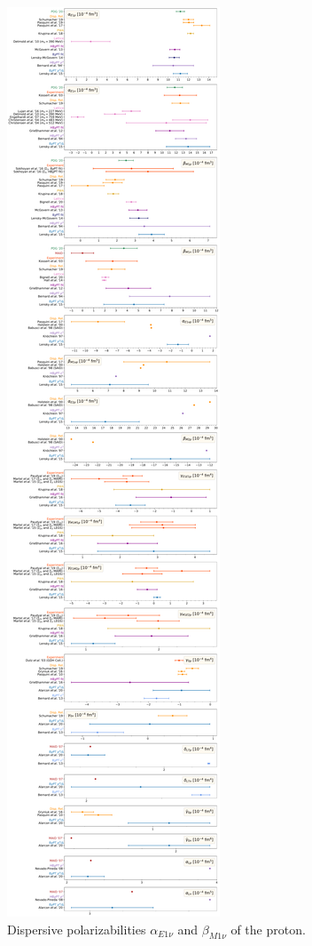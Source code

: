 \documentclass[preprints,review,accept,moreauthors,pdftex]{Definitions/mdpi}
\def\al{\alpha}
\def\be{\beta}
\begin{document}
\begin{figure}[t]
\centering
\includegraphics[width=\columnwidth]{Figures/DispersivePol.pdf}
\caption{Dispersive polarizabilities $\al_{E1\nu}$ and $\be_{M1\nu}$ of the proton. \label{DispersivePol}}
\end{figure} 
\end{document}
